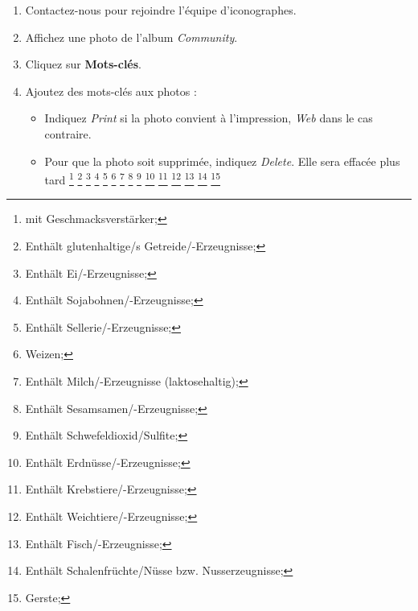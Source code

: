 \documentclass[12pt,nofoldmark,notumble]{leaflet}
\begin{document}
\begin{enumerate}[itemsep=0mm,leftmargin=*]

\item Contactez-nous pour rejoindre l'équipe d'iconographes.
\item Affichez une photo de l'album \emph{Community}.
\item Cliquez sur \faPencil \textbf{Mots-clés}.
\item Ajoutez des mots-clés aux photos :

  \begin{itemize}
  \item Indiquez \emph{Print} si la photo convient à l'impression, \emph{Web}
    dans le cas contraire.

  \item Pour que la photo soit supprimée, indiquez \emph{Delete}.  Elle sera
    effacée plus tard
    \footnote{mit Geschmacksverstärker;}
    \footnote{Enthält glutenhaltige/s Getreide/-Erzeugnisse;}
    \footnote{Enthält Ei/-Erzeugnisse;}
    \footnote{Enthält Sojabohnen/-Erzeugnisse;}
    \footnote{Enthält Sellerie/-Erzeugnisse;}
    \footnote{Weizen;}
    \footnote{Enthält Milch/-Erzeugnisse (laktosehaltig);}
    \footnote{Enthält Sesamsamen/-Erzeugnisse;}
    \footnote{Enthält Schwefeldioxid/Sulfite;}
    \footnote{Enthält Erdnüsse/-Erzeugnisse; }
    \footnote{Enthält Krebstiere/-Erzeugnisse;}
    \footnote{Enthält Weichtiere/-Erzeugnisse;}
    \footnote{Enthält Fisch/-Erzeugnisse;}
    \footnote{Enthält Schalenfrüchte/Nüsse bzw. Nusserzeugnisse;}
    \footnote{Gerste;}
  \end{itemize}
\end{enumerate}
  
\end{document}
